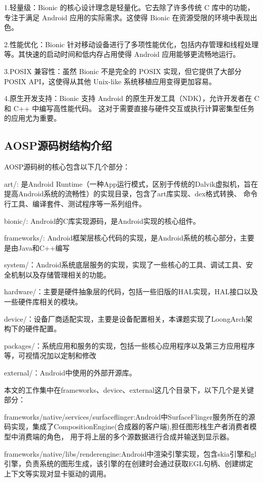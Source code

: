 1.轻量级：Bionic 的核心设计理念是轻量化。它去除了许多传统 C 库中的功能，专注于满足 Android 应用的实际需求。这使得 Bionic 
在资源受限的环境中表现出色。

2.性能优化：Bionic 针对移动设备进行了多项性能优化，包括内存管理和线程处理等。其快速的启动时间和低内存占用使得 
Android 应用能够更流畅地运行。

3.POSIX 兼容性：虽然 Bionic 不是完全的 POSIX 实现，但它提供了大部分 POSIX API，这使得从其他 Unix-like 
系统移植应用变得更加容易。

4.原生开发支持：Bionic 支持 Android 的原生开发工具（NDK），允许开发者在 C 和 C++ 中编写高性能代码。
这对于需要直接与硬件交互或执行计算密集型任务的应用尤为重要。

\subsection{AOSP源码树结构介绍}
AOSP源码树的核心包含以下几个部分：

  art/: 是Android Runtime（一种App运行模式，区别于传统的Dalvik虚拟机，旨在提高Android系统的流畅性）的实现目录，包含了art库实现、dex格式转换、
  命令行工具、编译套件、测试程序等一系列组件。

  bionic/: Android的C库实现源码，是Android实现的核心组件。

  frameworks/: Android框架层核心代码的实现，是Android系统的核心部分，主要是由Java和C++编写

  system/：Android系统底层服务的实现，实现了一些核心的工具、调试工具、安全机制以及存储管理相关的功能。

  hardware/：主要是硬件抽象层的代码，包括一些旧版的HAL实现，HAL接口以及一些硬件库相关的模块。

  device/：设备厂商适配实现，主要是设备配置相关，本课题实现了LoongArch架构下的硬件配置。

  packages/：系统应用和服务的实现，包括一些核心应用程序以及第三方应用程序等，可视情况加以定制和修改

  external/：Android中使用的外部开源库。

  本文的工作集中在frameworks、device、external这几个目录下，以下几个是关键部分：

  frameworks/native/services/surfaceflinger:Android中SurfaceFlinger服务所在的源码实现，集成了CompositionEngine(合成器的客户端),担任图形栈生产者消费者模型中消费端的角色，
  用于将上层的多个源数据进行合成并输送到显示器。

  frameworks/native/libs/renderengine:Android中渲染引擎实现，包含skia引擎和gl引擎，负责系统的图形生成，该引擎的在创建时会通过获取EGL句柄、创建绑定上下文等实现对显卡驱动的调用。

